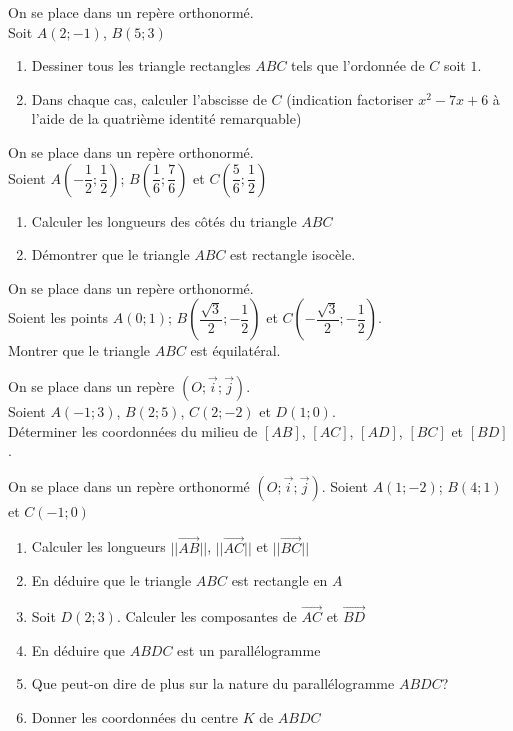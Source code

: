 \begin{exercice}
On se place dans un repère orthonormé.\\
Soit $A(2;-1)$, $B(5;3)$
\begin{enumerate}
\item Dessiner tous les triangle rectangles $ABC$ tels que l'ordonnée de $C$ soit $1$.
\item Dans chaque cas, calculer l'abscisse de $C$ (indication factoriser $x^2-7x+6$ à l'aide de la quatrième identité remarquable)
\end{enumerate} 
\end{exercice}

\begin{exercice}
On se place dans un repère orthonormé.\\
Soient $A\left( -\dfrac{1}{2};\dfrac{1}{2}\right) $; $B\left(\dfrac{1}{6};\dfrac{7}{6} \right)$ et $C \left(\dfrac{5}{6};\dfrac{1}{2} \right)$
\begin{enumerate}
\item Calculer les longueurs des côtés du triangle $ABC$
\item Démontrer que le triangle $ABC$ est rectangle isocèle.
\end{enumerate}
\end{exercice}

\begin{exercice}
On se place dans un repère orthonormé.\\
Soient les points $A(0;1)$; $B\left(\dfrac{\sqrt{3}}{2};-\dfrac{1}{2} \right)$ et $C\left(-\dfrac{\sqrt{3}}{2};-\dfrac{1}{2}\right)$.\\
 Montrer que le triangle $ABC$ est équilatéral.
\end{exercice}


\begin{exercice}
On se place dans un repère $(O;\vec{i};\vec{j})$.\\ Soient $A(-1;3)$, $B(2;5)$, $C(2;-2)$ et $D(1;0)$.\\
Déterminer les coordonnées du milieu de $[AB]$, $[AC]$, $[AD]$, $[BC]$ et $[BD]$.
\end{exercice}

\begin{exercice}
On se place dans un repère orthonormé $(O;\vec{i};\vec{j})$. Soient $A(1;-2)$; $B(4;1)$ et $C(-1;0)$
\begin{enumerate}
\item Calculer les longueurs $||\overrightarrow{AB}||$, $||\overrightarrow{AC}||$ et $||\overrightarrow{BC}||$
\item En déduire que le triangle $ABC$ est rectangle en $A$
\item Soit $D(2;3)$. Calculer les composantes de $\overrightarrow{AC}$ et $\overrightarrow{BD}$
\item En déduire que $ABDC$ est un parallélogramme
\item Que peut-on dire de plus sur la nature du parallélogramme $ABDC$?
\item Donner les coordonnées du centre $K$ de $ABDC$
\end{enumerate}
\end{exercice}

